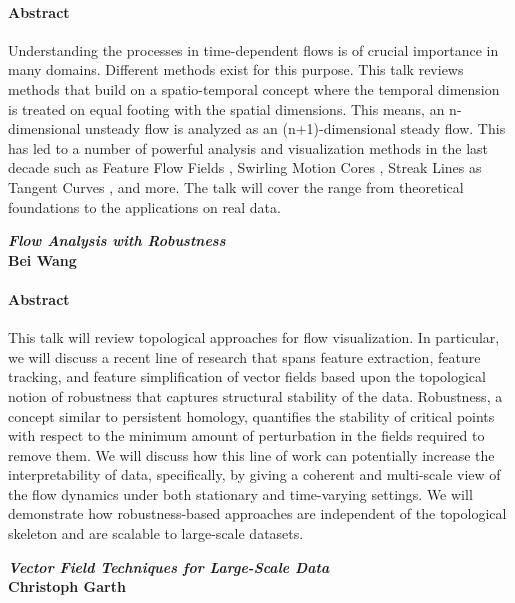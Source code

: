 \documentclass[preprint,journal]{vgtc}       %
\newcommand{\addverticalspace}{\vspace{3mm}}
\begin{document}
\paragraph{Abstract}
Understanding the processes in time-dependent flows is of crucial importance in many domains. Different methods exist for this purpose. This talk reviews methods that build on a spatio-temporal concept where the temporal dimension is treated on equal footing with the spatial dimensions. This means, an n-dimensional unsteady flow is analyzed as an (n+1)-dimensional steady flow. This has led to a number of powerful analysis and visualization methods in the last decade such as Feature Flow Fields \cite{theisel03b, weinkauf11b}, Swirling Motion Cores \cite{weinkauf07c}, Streak Lines as Tangent Curves \cite{weinkauf10c, weinkauf12a}, and more. The talk will cover the range from theoretical foundations to the applications on real data.

\addverticalspace

\noindent\textbf{\textit{Flow Analysis with Robustness}}\\
\textbf{Bei Wang}
\paragraph{Abstract}
This talk will review topological approaches for flow visualization. In particular, we will discuss a recent line of research that spans feature extraction, feature tracking, and feature simplification of vector fields based upon the topological notion of robustness that captures structural stability of the data. Robustness, a concept similar to persistent homology, quantifies the stability of critical points with respect to the minimum amount of perturbation in the fields required to remove them. We will discuss how this line of work can potentially increase the interpretability of data, specifically, by giving a coherent and multi-scale view of the flow dynamics under both stationary and time-varying settings. We will demonstrate how robustness-based approaches are independent of the topological skeleton and are scalable to large-scale datasets.

\addverticalspace

\noindent\textbf{\textit{Vector Field Techniques for Large-Scale Data}}\\
\textbf{Christoph Garth}
\end{document}
